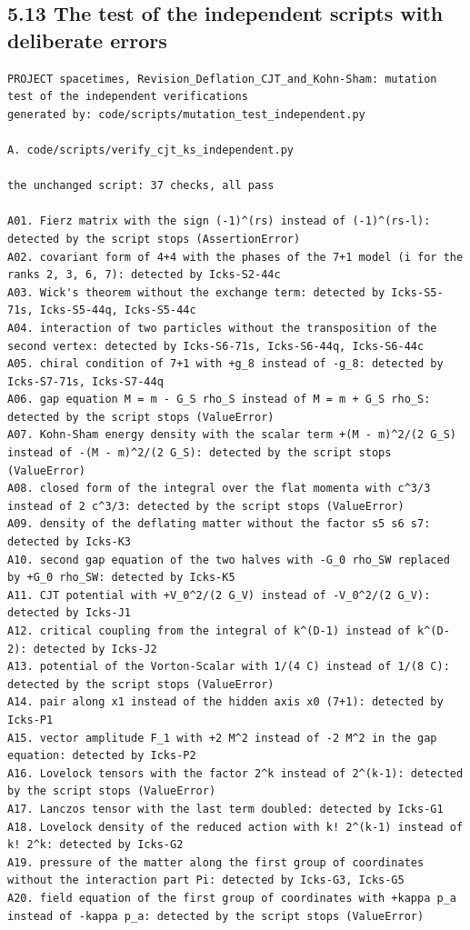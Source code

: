 \documentclass[
  10pt,
]{article}
\begin{document}
\hypertarget{the-test-of-the-independent-scripts-with-deliberate-errors}{%
\subsection{5.13 The test of the independent scripts with deliberate
errors}\label{the-test-of-the-independent-scripts-with-deliberate-errors}}

\begin{verbatim}
PROJECT spacetimes, Revision_Deflation_CJT_and_Kohn-Sham: mutation test of the independent verifications
generated by: code/scripts/mutation_test_independent.py

A. code/scripts/verify_cjt_ks_independent.py

the unchanged script: 37 checks, all pass

A01. Fierz matrix with the sign (-1)^(rs) instead of (-1)^(rs-l): detected by the script stops (AssertionError)
A02. covariant form of 4+4 with the phases of the 7+1 model (i for the ranks 2, 3, 6, 7): detected by Icks-S2-44c
A03. Wick's theorem without the exchange term: detected by Icks-S5-71s, Icks-S5-44q, Icks-S5-44c
A04. interaction of two particles without the transposition of the second vertex: detected by Icks-S6-71s, Icks-S6-44q, Icks-S6-44c
A05. chiral condition of 7+1 with +g_8 instead of -g_8: detected by Icks-S7-71s, Icks-S7-44q
A06. gap equation M = m - G_S rho_S instead of M = m + G_S rho_S: detected by the script stops (ValueError)
A07. Kohn-Sham energy density with the scalar term +(M - m)^2/(2 G_S) instead of -(M - m)^2/(2 G_S): detected by the script stops (ValueError)
A08. closed form of the integral over the flat momenta with c^3/3 instead of 2 c^3/3: detected by the script stops (ValueError)
A09. density of the deflating matter without the factor s5 s6 s7: detected by Icks-K3
A10. second gap equation of the two halves with -G_0 rho_SW replaced by +G_0 rho_SW: detected by Icks-K5
A11. CJT potential with +V_0^2/(2 G_V) instead of -V_0^2/(2 G_V): detected by Icks-J1
A12. critical coupling from the integral of k^(D-1) instead of k^(D-2): detected by Icks-J2
A13. potential of the Vorton-Scalar with 1/(4 C) instead of 1/(8 C): detected by the script stops (ValueError)
A14. pair along x1 instead of the hidden axis x0 (7+1): detected by Icks-P1
A15. vector amplitude F_1 with +2 M^2 instead of -2 M^2 in the gap equation: detected by Icks-P2
A16. Lovelock tensors with the factor 2^k instead of 2^(k-1): detected by the script stops (ValueError)
A17. Lanczos tensor with the last term doubled: detected by Icks-G1
A18. Lovelock density of the reduced action with k! 2^(k-1) instead of k! 2^k: detected by Icks-G2
A19. pressure of the matter along the first group of coordinates without the interaction part Pi: detected by Icks-G3, Icks-G5
A20. field equation of the first group of coordinates with +kappa p_a instead of -kappa p_a: detected by the script stops (ValueError)


\end{verbatim}
\end{document}
